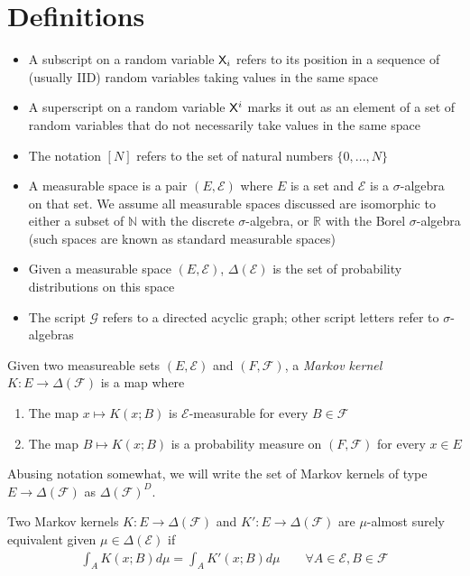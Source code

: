 \section{Definitions}


\begin{itemize}
    \item A subscript on a random variable $\mathsf{X}_i$ refers to its position in a sequence of (usually IID) random variables taking values in the same space
    \item A superscript on a random variable $\mathsf{X}^i$ marks it out as an element of a set of random variables that do not necessarily take values in the same space
    \item The notation $[N]$ refers to the set of natural numbers $\{0,...,N\}$
    \item A measurable space is a pair $(E,\mathcal{E})$ where $E$ is a set and $\mathcal{E}$ is a $\sigma$-algebra on that set. We assume all measurable spaces discussed are isomorphic to either a subset of $\mathbb{N}$ with the discrete $\sigma$-algebra, or $\mathbb{R}$ with the Borel $\sigma$-algebra (such spaces are known as standard measurable spaces)
    \item Given a measurable space $(E,\mathcal{E})$, $\Delta(\mathcal{E})$ is the set of probability distributions on this space
    \item The script $\mathcal{G}$ refers to a directed acyclic graph; other script letters refer to $\sigma$-algebras
\end{itemize}



Given two measureable sets $(E,\mathcal{E})$ and $(F,\mathcal{F})$, a \emph{Markov kernel} $K:E\to \Delta(\mathcal{F})$ is a map where
\begin{enumerate}
    \item The map $x\mapsto K(x;B)$ is $\mathcal{E}$-measurable for every $B\in\mathcal{F}$
    \item The map $B\mapsto K(x;B)$ is a probability measure on $(F,\mathcal{F})$ for every $x\in E$
\end{enumerate}

Abusing notation somewhat, we will write the set of Markov kernels of type $E\to \Delta(\mathcal{F})$ as $\Delta(\mathcal{F})^D$.

Two Markov kernels $K:E\to \Delta(\mathcal{F})$ and $K':E\to \Delta(\mathcal{F})$ are $\mu$-almost surely equivalent given $\mu\in \Delta(\mathcal{E})$ if
\begin{align}
    \int_A K(x;B) d\mu = \int_A K'(x;B) d\mu\qquad\forall A\in \mathcal{E}, B\in\mathcal{F}
\end{align}


